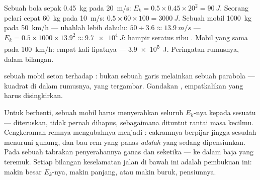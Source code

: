 \begin{example}\label{ex:g9:kinetic-energy-safety:first}
Sebuah bola sepak \qty{0.45}{kg} pada \qty{20}{m/s}: $E_k = 0.5 \times
0.45 \times 20^2 = \qty{90}{J}$. Seorang pelari cepat \qty{60}{kg} pada
\qty{10}{m/s}: $0.5 \times 60 \times 100 = \qty{3000}{J}$. Sebuah mobil
\qty{1000}{kg} pada \qty{50}{km/h} --- ubahlah lebih dahulu:
$50 \div 3.6 \approx \qty{13.9}{m/s}$ --- $E_k = 0.5 \times
1000 \times 13.9^2 \approx \qty{9.7e4}{J}$: hampir seratus ribu .
Mobil yang sama pada \qty{100}{km/h}: empat kali lipatnya ---
\qty{3.9e5}{J}. Peringatan rumusnya, dalam bilangan.
\end{example}

\begin{omfigure}

{\small {} sebuah mobil seton terhadap : bukan
sebuah garis melainkan sebuah parabola --- kuadrat di dalam rumusnya,
yang tergambar. Gandakan , empatkalikan  yang harus
disingkirkan.}
\end{omfigure}

\begin{example}\label{ex:g9:kinetic-energy-safety:brakes}
Untuk berhenti, sebuah mobil harus menyerahkan seluruh $E_k$-nya
kepada sesuatu ---  diteruskan, tidak pernah dihapus, sebagaimana
dituntut rantai masa kecilmu. Cengkeraman remnya mengubahnya menjadi
: cakramnya berpijar jingga sesudah menuruni gunung, dan bau rem
yang panas \emph{adalah}  yang sedang dipensiunkan. Pada
sebuah tabrakan penyerahannya ganas dan seketika --- ke dalam baja yang
teremuk. Setiap bilangan keselamatan jalan di bawah ini adalah
pembukuan ini: makin besar $E_k$-nya, makin panjang, atau makin buruk,
pensiunnya.
\end{example}

